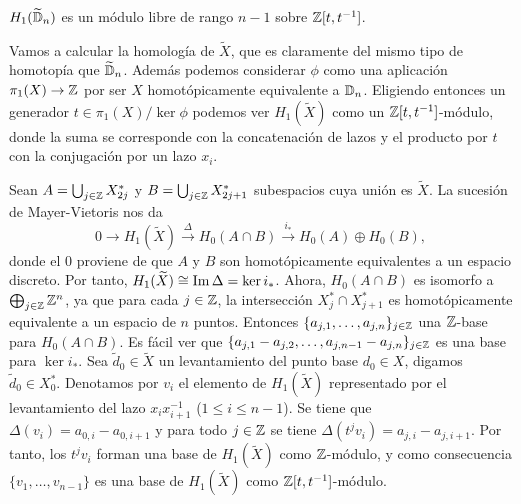 \documentclass[TFG.tex]{subfiles}
\begin{document}
\begin{prop}\label{dimension}
$H_1(\widetilde{\mathbb{D}}_n)$ es un módulo libre de rango $n-1$ sobre $\mathbb{Z}[t,t^{-1}]$.
\end{prop}
\begin{dem}



Vamos a calcular la homología de $\widetilde{X}$, que es claramente del mismo tipo de homotopía que $\widetilde{\mathbb{D}}_n$. Además podemos considerar $\phi$ como una aplicación $\pi_1(X)\to\mathbb{Z}$ por ser $X$ homotópicamente equivalente a $\mathbb{D}_n$. Eligiendo entonces un generador $t\in \pi_1(X)/\ker\phi$ podemos ver $H_1(\widetilde{X})$ como un $\mathbb{Z}[t,t^{-1}]$-módulo, donde la suma se corresponde con la concatenación de lazos y el producto por $t$ con la conjugación por un lazo $x_i$. 

Sean $A=\bigcup_{j\in\mathbb{Z}}X_{2j}^*$ y $B=\bigcup_{j\in\mathbb{Z}}X_{2j+1}^*$ subespacios cuya unión es $\widetilde{X}$. La sucesión de Mayer-Vietoris nos da
\[
0\to H_1(\widetilde{X})\overset{\Delta}{\to} H_0(A\cap B)\overset{i_*}{\to} H_0(A)\oplus H_0(B),
\]
donde el 0 proviene de que $A$ y $B$ son homotópicamente equivalentes a un espacio discreto. Por tanto, $H_1(\widetilde{X})\cong \operatorname{Im}\Delta=\ker i_*$. Ahora, $H_0(A\cap B)$ es isomorfo a $\bigoplus_{j\in\mathbb{Z}}\mathbb{Z}^n$, ya que para cada $j\in\mathbb{Z}$, la intersección $X_j^*\cap X_{j+1}^*$ es homotópicamente equivalente a un espacio de $n$ puntos. Entonces $\{a_{j,1},\dots, a_{j,n}\}_{j\in\mathbb{Z}}$ una $\mathbb{Z}$-base para $H_0(A\cap B)$. Es fácil ver que $\{a_{j,1}-a_{j,2},\dots,a_{j,n-1}-a_{j,n}\}_{j\in\mathbb{Z}}$ es una base para $\ker i_*$. Sea $\tilde{d}_0\in\widetilde{X}$ un levantamiento del punto base $d_0\in X$, digamos $\tilde{d}_0\in X_0^*$. Denotamos por $v_i$ el elemento de $H_1(\widetilde{X})$ representado por el levantamiento del lazo $x_ix_{i+1}^{-1}$ ($1\leq i\leq n-1$). Se tiene que $\Delta (v_i)=a_{0,i}-a_{0,i+1}$ \cite{thesis} y para todo $j\in\mathbb{Z}$ se tiene $\Delta(t^j v_i)=a_{j,i}-a_{j,i+1}$. Por tanto, los $t^jv_i$ forman una base de $H_1(\widetilde{X})$ como $\mathbb{Z}$-módulo, y como consecuencia $\{v_1,\dots, v_{n-1}\}$ es una base de $H_1(\widetilde{X})$ como $\mathbb{Z}[t,t^{-1}]$-módulo. \QED

\end{dem}
\end{document}
